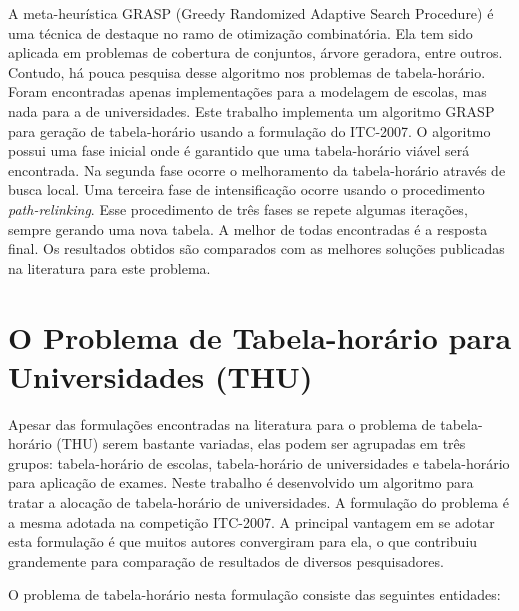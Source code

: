 \documentclass[11pt]{article}
\begin{document}
A meta-heurística GRASP (Greedy Randomized Adaptive Search Procedure) é uma técnica de destaque no ramo de otimização combinatória. Ela tem sido aplicada em problemas de cobertura de conjuntos, árvore geradora, entre outros. Contudo, há pouca pesquisa desse algoritmo nos problemas de tabela-horário. Foram encontradas apenas implementações para a modelagem de escolas, mas nada para a de universidades.
Este trabalho implementa um algoritmo GRASP para geração de tabela-horário usando a formulação do ITC-2007. O algoritmo possui uma fase inicial onde é garantido que uma tabela-horário viável será encontrada. Na segunda fase ocorre o melhoramento da tabela-horário através de busca local. Uma terceira fase de intensificação ocorre usando o procedimento \textit{path-relinking}. Esse procedimento de três fases se repete algumas iterações, sempre gerando uma nova tabela. A melhor de todas encontradas é a resposta final.
Os resultados obtidos são comparados com as melhores soluções publicadas na literatura para este problema.

\section{O Problema de Tabela-horário para Universidades (THU)}

Apesar das formulações encontradas na literatura para o problema de tabela-horário (THU) serem bastante variadas, elas podem ser agrupadas em três grupos: tabela-horário de escolas, tabela-horário de universidades e tabela-horário para aplicação de exames. Neste trabalho é desenvolvido um algoritmo para tratar a alocação de tabela-horário de universidades. A formulação do problema é a mesma adotada na competição ITC-2007. A principal vantagem em se adotar esta formulação é que muitos autores convergiram para ela, o que contribuiu grandemente para comparação de resultados de diversos pesquisadores.

O problema de tabela-horário nesta formulação consiste das seguintes entidades:
\end{document}
